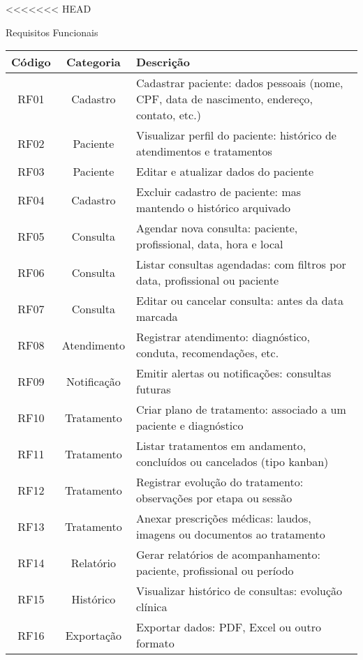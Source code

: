 <<<<<<< HEAD
\begin{quadro}
    \caption{\label{quadro_requisitos_f}Requisitos Funcionais}
    \begin{tabular}{|c|c|p{10cm}|}
        \hline
        \textbf{Código} & \textbf{Categoria} & \textbf{Descrição} \\ \hline
        RF01   & Cadastro     & Cadastrar paciente: dados pessoais (nome, CPF, data de nascimento, endereço, contato, etc.) \\ \hline
        RF02   & Paciente     & Visualizar perfil do paciente: histórico de atendimentos e tratamentos \\ \hline
        RF03   & Paciente     & Editar e atualizar dados do paciente \\ \hline
        RF04   & Cadastro     & Excluir cadastro de paciente: mas mantendo o histórico arquivado \\ \hline
        RF05   & Consulta     & Agendar nova consulta: paciente, profissional, data, hora e local \\ \hline
        RF06   & Consulta     & Listar consultas agendadas: com filtros por data, profissional ou paciente \\ \hline
        RF07   & Consulta     & Editar ou cancelar consulta: antes da data marcada \\ \hline
        RF08   & Atendimento  & Registrar atendimento: diagnóstico, conduta, recomendações, etc. \\ \hline
        RF09   & Notificação  & Emitir alertas ou notificações: consultas futuras \\ \hline
        RF10   & Tratamento   & Criar plano de tratamento: associado a um paciente e diagnóstico \\ \hline
        RF11   & Tratamento   & Listar tratamentos em andamento, concluídos ou cancelados (tipo kanban) \\ \hline
        RF12   & Tratamento   & Registrar evolução do tratamento: observações por etapa ou sessão \\ \hline
        RF13   & Tratamento   & Anexar prescrições médicas: laudos, imagens ou documentos ao tratamento \\ \hline
        RF14   & Relatório    & Gerar relatórios de acompanhamento: paciente, profissional ou período \\ \hline
        RF15   & Histórico    & Visualizar histórico de consultas: evolução clínica \\ \hline
        RF16   & Exportação   & Exportar dados: PDF, Excel ou outro formato \\ \hline

\end{tabular}
\end{quadro}
